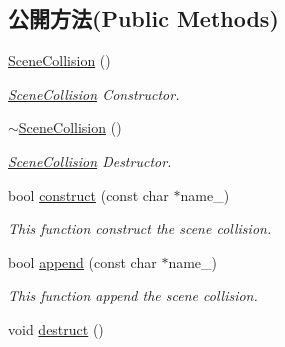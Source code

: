 \subsection*{公開方法(Public Methods)}
\begin{DoxyCompactItemize}
\item 
\hyperlink{class_i_dream_sky_1_1_scene_collision_a9934c3bee65de22ef38f32a1650c8cad}{Scene\+Collision} ()
\begin{DoxyCompactList}\small\item\em \hyperlink{class_i_dream_sky_1_1_scene_collision}{Scene\+Collision} Constructor. \end{DoxyCompactList}\item 
\hyperlink{class_i_dream_sky_1_1_scene_collision_abf49d105e9376249cfb370806a0d8e87}{$\sim$\+Scene\+Collision} ()
\begin{DoxyCompactList}\small\item\em \hyperlink{class_i_dream_sky_1_1_scene_collision}{Scene\+Collision} Destructor. \end{DoxyCompactList}\item 
bool \hyperlink{class_i_dream_sky_1_1_scene_collision_ac06f63c3a95dd5155a96299588af12e8}{construct} (const char $\ast$name\+\_\+)
\begin{DoxyCompactList}\small\item\em This function construct the scene collision. \end{DoxyCompactList}\item 
bool \hyperlink{class_i_dream_sky_1_1_scene_collision_a58440e2d63ca6ff943e66c5e0f0c8eb5}{append} (const char $\ast$name\+\_\+)
\begin{DoxyCompactList}\small\item\em This function append the scene collision. \end{DoxyCompactList}\item 
void \hyperlink{class_i_dream_sky_1_1_scene_collision_a4abd6ba47d719259922fb8ee3e5949c6}{destruct} ()\hypertarget{class_i_dream_sky_1_1_scene_collision_a4abd6ba47d719259922fb8ee3e5949c6}{}\label{class_i_dream_sky_1_1_scene_collision_a4abd6ba47d719259922fb8ee3e5949c6}


\end{DoxyCompactItemize}
